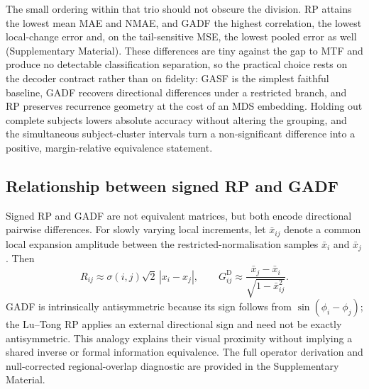 \documentclass[preprint,12pt]{elsarticle}
\begin{document}
The small ordering within that trio should not obscure the division. RP attains the lowest mean MAE and NMAE, and GADF the highest correlation, the lowest local-change error and, on the tail-sensitive MSE, the lowest pooled error as well (Supplementary Material). These differences are tiny against the gap to MTF and produce no detectable classification separation, so the practical choice rests on the decoder contract rather than on fidelity: GASF is the simplest faithful baseline, GADF recovers directional differences under a restricted branch, and RP preserves recurrence geometry at the cost of an MDS embedding. Holding out complete subjects lowers absolute accuracy without altering the grouping, and the simultaneous subject-cluster intervals turn a non-significant difference into a positive, margin-relative equivalence statement.

\subsection{Relationship between signed RP and GADF}\label{sec:disc_structural}

Signed RP and GADF are not equivalent matrices, but both encode directional pairwise differences. For slowly varying local increments, let \(\bar x_{ij}\) denote a common local expansion amplitude between the restricted-normalisation samples \(\bar x_i\) and \(\bar x_j\). Then
\[
R_{ij}\approx \sigma(i,j)\sqrt2\,|x_i-x_j|,
\qquad
G^{\mathrm D}_{ij}\approx
\frac{\bar x_j-\bar x_i}{\sqrt{1-\bar x_{ij}^2}}.
\]
GADF is intrinsically antisymmetric because its sign follows from \(\sin(\phi_i-\phi_j)\); the Lu--Tong RP applies an external directional sign and need not be exactly antisymmetric. This analogy explains their visual proximity without implying a shared inverse or formal information equivalence. The full operator derivation and null-corrected regional-overlap diagnostic are provided in the Supplementary Material.
\end{document}
